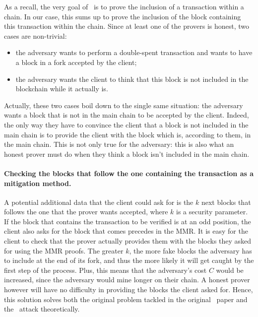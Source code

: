     As a recall, the very goal of \FC\ is to prove the inclusion of a transaction within a chain. In our case, this sums up to prove the inclusion of the block containing this transaction within the chain. Since at least one of the provers is honest, two cases are non-trivial:
    
    \begin{itemize}
        \item the adversary wants to perform a double-spent transaction and wants to have a block in a fork accepted by the client;
        \item the adversary wants the client to think that this block is not included in the blockchain while it actually is.
    \end{itemize}
    
    Actually, these two cases boil down to the single same situation: the adversary wants a block that is not in the main chain to be accepted by the client. Indeed, the only way they have to convince the client that a block is not included in the main chain is to provide the client with the block which is, according to them, in the main chain. This is not only true for the adversary: this is also what an honest prover must do when they think a block isn't included in the main chain.
   
    \paragraph{Checking the blocks that follow the one containing the transaction as a mitigation method.} A potential additional data that the client could ask for is the \(k\) next blocks that follows the one that the prover wants accepted, where \(k\) is a security parameter. If the block that contains the transaction to be verified is at an odd position, the client also asks for the block that comes precedes in the MMR. It is easy for the client to check that the prover actually provides them with the blocks they asked for using the MMR proofs. The greater \(k\), the more fake blocks the adversary has to include at the end of its fork, and thus the more likely it will get caught by the first step of the process. Plus, this means that the adversary's cost \(C\) would be increased, since the adversary would mine longer on their chain. A honest prover however will have no difficulty in providing the blocks the client asked for. Hence, this solution solves both the original problem tackled in the original \FC\ paper and the \cs\ attack theoretically.
    
